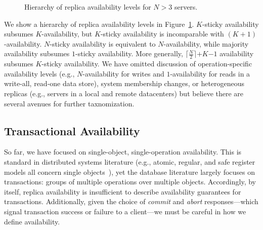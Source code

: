 \begin{figure}
\centering
{}
\caption{Hierarchy of replica availability levels for $N>3$ servers.}
\label{fig:availability-order}
\end{figure}

We show a hierarchy of replica availability levels in
Figure~\ref{fig:availability-order}. $K$-sticky availability subsumes
$K$-availability, but $K$-sticky availability is incomparable with
$(K+1)$-availability. $N$-sticky availability is equivalent to
$N$-availability, while majority availability subsumes $1$-sticky
availability. More generally, $\lceil \frac{N}{2} \rceil$$+$$K$$-$$1$
availability subsumes $K$-sticky availability. We have omitted
discussion of operation-specific availability levels (e.g.,
$N$-availability for writes and $1$-availability for reads in a
write-all, read-one data store), system membership changes, or
heterogeneous replicas (e.g., servers in a local and remote
datacenters) but believe there are several avenues for further
taxnomization.

\subsection{Transactional Availability}

So far, we have focused on single-object, single-operation
availability. This is standard in distributed systems literature
(e.g., atomic, regular, and safe register models all concern single
objects~\cite{herlihy-art}), yet the database literature largely
focuses on transactions: groups of multiple operations over multiple
objects. Accordingly, by itself, replica availability is insufficient
to describe availability guarantees for transactions. Additionally,
given the choice of \textit{commit} and \textit{abort}
responses---which signal transaction success or failure to a
client---we must be careful in how we define availability.

